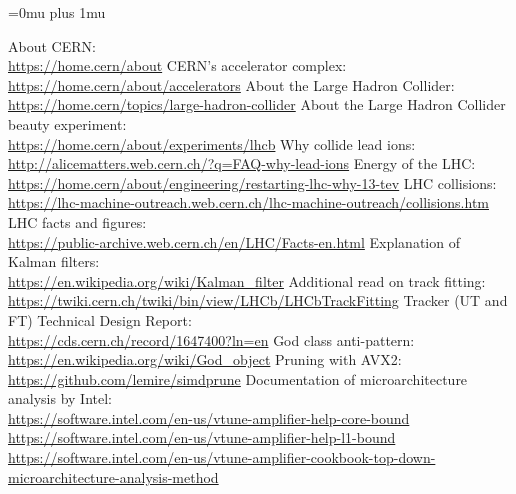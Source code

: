 \documentclass[12pt]{article}
\begin{document}
{
	\raggedright
	\Urlmuskip=0mu plus 1mu

	\begin{thebibliography}{asd}
		 About CERN: \\
			\url{https://home.cern/about}
		 CERN's accelerator complex: \\
			\url{https://home.cern/about/accelerators}
		 About the Large Hadron Collider: \\
			\url{https://home.cern/topics/large-hadron-collider}
		 About the Large Hadron Collider beauty experiment: \\
			\url{https://home.cern/about/experiments/lhcb}
		 Why collide lead ions: \\
			\url{http://alicematters.web.cern.ch/?q=FAQ-why-lead-ions}
		 Energy of the LHC: \\
			\url{https://home.cern/about/engineering/restarting-lhc-why-13-tev}
		 LHC collisions: \\
			\url{https://lhc-machine-outreach.web.cern.ch/lhc-machine-outreach/collisions.htm}
		 LHC facts and figures: \\
			\url{https://public-archive.web.cern.ch/en/LHC/Facts-en.html}
		 Explanation of Kalman filters: \\
			\url{https://en.wikipedia.org/wiki/Kalman_filter}
		 Additional read on track fitting: \\
			\url{https://twiki.cern.ch/twiki/bin/view/LHCb/LHCbTrackFitting}
		 Tracker (UT and FT) Technical Design Report: \\
			\url{https://cds.cern.ch/record/1647400?ln=en}
		 God class anti-pattern: \\
			\url{https://en.wikipedia.org/wiki/God_object}
		 Pruning with AVX2: \\
			\url{https://github.com/lemire/simdprune}
		 Documentation of microarchitecture analysis by Intel: \\
			\url{https://software.intel.com/en-us/vtune-amplifier-help-core-bound}\\
			\url{https://software.intel.com/en-us/vtune-amplifier-help-l1-bound}\\
			\url{https://software.intel.com/en-us/vtune-amplifier-cookbook-top-down-microarchitecture-analysis-method}

\end{thebibliography}}
\end{document}
